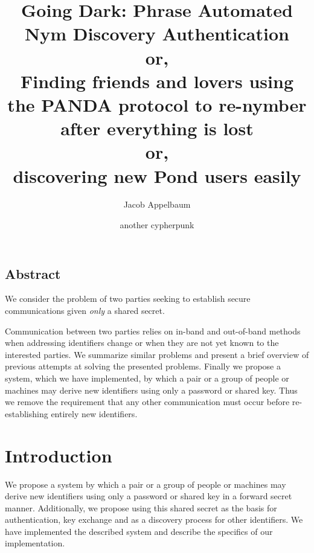 \documentclass[letterpaper,twocolumn,10pt]{article}
\begin{document}
\date{}

\title{
\Large \bf Going Dark: Phrase Automated Nym Discovery Authentication\\
\small or,\\
Finding friends and lovers using the PANDA protocol to re-nymber after everything is lost\\
\small or, \\
discovering new Pond users easily
}

\author{
{\rm Jacob Appelbaum}\\
\and
{\rm another cypherpunk}\\
}

\maketitle

\thispagestyle{empty}

\subsection*{Abstract}

We consider the problem of two parties seeking to establish secure
communications given {\it only} a shared secret.

Communication between two parties relies on in-band and out-of-band methods
when addressing identifiers change or when they are not yet known to the
interested parties. We summarize similar problems and present a brief overview
of previous attempts at solving the presented problems. Finally we propose a
system, which we have implemented, by which a pair or a group of people or
machines may derive new identifiers using only a password or shared key. Thus
we remove the requirement that any other communication must occur before
re-establishing entirely new identifiers.

\section{Introduction}

We propose a system by which a pair or a group of people or machines may derive
new identifiers using only a password or shared key in a forward secret manner.
Additionally, we propose using this shared secret as the basis for
authentication, key exchange and as a discovery process for other identifiers.
We have implemented the described system and describe the specifics of our
implementation.
\end{document}
